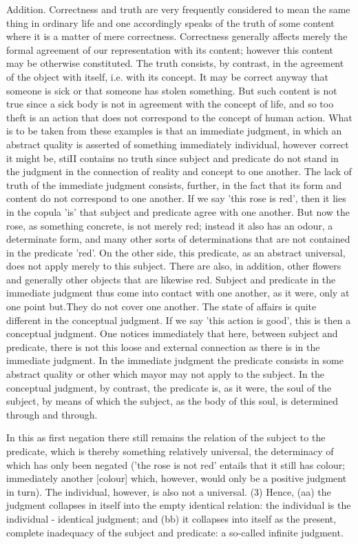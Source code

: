 Addition. Correctness and truth are very frequently considered to mean the same
thing in ordinary life and one accordingly speaks of the truth of some content
where it is a matter of mere correctness. Correctness generally affects merely the
formal agreement of our representation with its content; however this content may
be otherwise constituted. The truth consists, by contrast, in the agreement of the
object with itself, i.e. with its concept. It may be correct anyway that someone is
sick or that someone has stolen something. But such content is not true since a
sick body is not in agreement with the concept of life, and so too theft is an action
that does not correspond to the concept of human action. What is to be taken
from these examples is that an immediate judgment, in which an abstract quality
is asserted of something immediately individual, however correct it might be, stiII
contains no truth since subject and predicate do not stand in the judgment in
the connection of reality and concept to one another. The lack of truth of the
immediate judgment consists, further, in the fact that its form and content do not
correspond to one another. If we say 'this rose is red', then it lies in the copula 'is'
that subject and predicate agree with one another. But now the rose, as something
concrete, is not merely red; instead it also has an odour, a determinate form,
and many other sorts of determinations that are not contained in the predicate
'red'. On the other side, this predicate, as an abstract universal, does not apply
merely to this subject. There are also, in addition, other flowers and generally other
objects that are likewise red. Subject and predicate in the immediate judgment
thus come into contact with one another, as it were, only at one point but.They
do not cover one another. The state of affairs is quite different in the conceptual
judgment. If we say 'this action is good', this is then a conceptual judgment.
One notices immediately that here, between subject and predicate, there is not
this loose and external connection as there is in the immediate judgment. In the
immediate judgment the predicate consists in some abstract quality or other which
mayor may not apply to the subject. In the conceptual judgment, by contrast, the
predicate is, as it were, the soul of the subject, by means of which the subject, as
the body of this soul, is determined through and through.

In this as first negation there still remains
the relation of the subject to the predicate,
which is thereby something relatively universal,
the determinacy of which has only been negated
('the rose is not red' entails that it still has colour;
immediately another [colour] which, however,
would only be a positive judgment in turn).
The individual, however, is also not a universal.
(3) Hence, (aa) the judgment collapses in itself
into the empty identical relation:
the individual is the individual - identical judgment;
and (bb) it collapses into itself as the present,
complete inadequacy of the subject and predicate:
a so-called infinite judgment.

